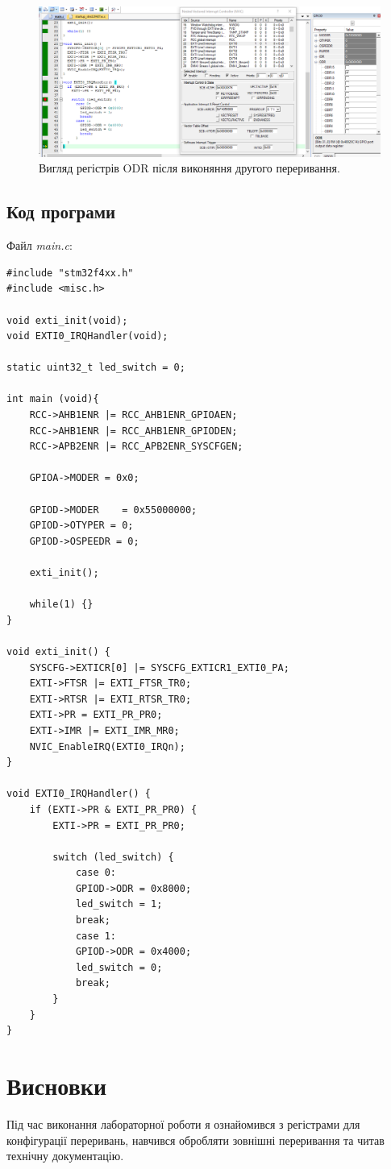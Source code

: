 \documentclass[oneside,14pt]{extarticle}
\begin{document}
\begin{normalsize}
	\begin{figure}[H]
		\centering
		\includegraphics[scale=0.45]{3}
		\caption{Вигляд регістрів ODR після виконяння другого переривання.}
	\end{figure}

	\subsection*{Код програми}
	Файл \textit{main.c}:
	{\small
		\begin{lstlisting}
#include "stm32f4xx.h"
#include <misc.h>

void exti_init(void);
void EXTI0_IRQHandler(void);

static uint32_t led_switch = 0;

int main (void){
	RCC->AHB1ENR |= RCC_AHB1ENR_GPIOAEN;
	RCC->AHB1ENR |= RCC_AHB1ENR_GPIODEN;
	RCC->APB2ENR |= RCC_APB2ENR_SYSCFGEN;
	
	GPIOA->MODER = 0x0;
	
	GPIOD->MODER	= 0x55000000;
	GPIOD->OTYPER = 0;
	GPIOD->OSPEEDR = 0;
	
	exti_init();
	
	while(1) {}
}

void exti_init() {
	SYSCFG->EXTICR[0] |= SYSCFG_EXTICR1_EXTI0_PA;
	EXTI->FTSR |= EXTI_FTSR_TR0;
	EXTI->RTSR |= EXTI_RTSR_TR0;
	EXTI->PR = EXTI_PR_PR0;
	EXTI->IMR |= EXTI_IMR_MR0;
	NVIC_EnableIRQ(EXTI0_IRQn);
}

void EXTI0_IRQHandler() {
	if (EXTI->PR & EXTI_PR_PR0) {
		EXTI->PR = EXTI_PR_PR0;
		
		switch (led_switch) {
			case 0:
			GPIOD->ODR = 0x8000;
			led_switch = 1;
			break;
			case 1:
			GPIOD->ODR = 0x4000;
			led_switch = 0;
			break;
		}
	}
}
		\end{lstlisting}
	}
	
	\section*{Висновки}
	Під час виконання лабораторної роботи я ознайомився з регістрами для конфігурації переривань, навчився обробляти зовнішні переривання та читав технічну документацію.
	    
\end{normalsize}
\end{document}
